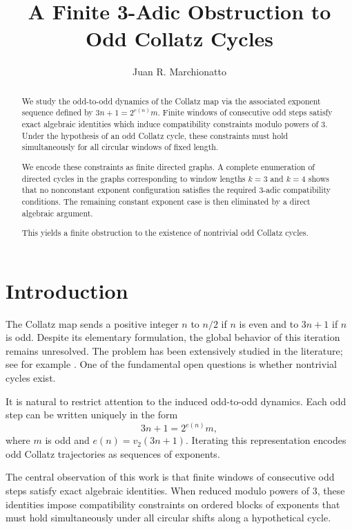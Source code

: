 \documentclass[11pt]{article}
\title{A Finite 3-Adic Obstruction to Odd Collatz Cycles}
\author{Juan R. Marchionatto}
\date{}
\theoremstyle{definition}
\theoremstyle{plain}
\theoremstyle{remark}
\begin{document}
\maketitle

\begin{abstract}
We study the odd-to-odd dynamics of the Collatz map via the associated
exponent sequence defined by $3n+1=2^{e(n)}m$.
Finite windows of consecutive odd steps satisfy exact algebraic identities
which induce compatibility constraints modulo powers of $3$.
Under the hypothesis of an odd Collatz cycle, these constraints must hold
simultaneously for all circular windows of fixed length.

We encode these constraints as finite directed graphs.
A complete enumeration of directed cycles in the graphs corresponding to
window lengths $k=3$ and $k=4$ shows that no nonconstant exponent configuration
satisfies the required $3$-adic compatibility conditions.
The remaining constant exponent case is then eliminated by a direct algebraic
argument.

This yields a finite obstruction to the existence of nontrivial odd
Collatz cycles.
\end{abstract}

\section{Introduction}

The Collatz map sends a positive integer $n$ to $n/2$ if $n$ is even and
to $3n+1$ if $n$ is odd.
Despite its elementary formulation, the global behavior of this iteration
remains unresolved. The problem has been extensively studied in the literature;
see for example \cite{Lagarias1985,Lagarias2010}.
One of the fundamental open questions is whether nontrivial cycles exist.

It is natural to restrict attention to the induced odd-to-odd dynamics.
Each odd step can be written uniquely in the form
\[
3n+1 = 2^{e(n)} m,
\]
where $m$ is odd and $e(n)=v_2(3n+1)$.
Iterating this representation encodes odd Collatz trajectories as sequences
of exponents.

The central observation of this work is that finite windows of consecutive
odd steps satisfy exact algebraic identities.
When reduced modulo powers of $3$, these identities impose compatibility
constraints on ordered blocks of exponents that must hold simultaneously
under all circular shifts along a hypothetical cycle.
\end{document}
